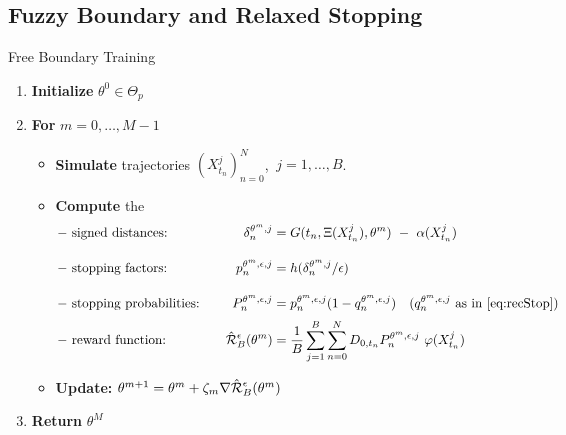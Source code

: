 \subsection{Fuzzy Boundary and Relaxed Stopping}

\begin{algorithm}[t]
\label{alg:FBTrain}
\caption{Free Boundary Training}\label{alg:cap} 
\begin{enumerate}
\setlength \itemsep{0.05ex}
\vspace{-3mm}

\item \textbf{Initialize} $\theta^{0} \in \Theta_p$
\item \textbf{For} $m = 0,\ldots, M-1$
    \begin{itemize}
    \setlength \itemsep{0.4ex}
    \vspace{-2mm}
        \item \textbf{Simulate} trajectories $(X_{t_n}^j)_{n=0}^N$, $\ j=1,\ldots,B$.
        \item 
        \textbf{Compute} the
        \vspace{-3mm}
\begin{align*}
-&\text{ signed distances:} \quad &\delta^{\theta^{m}, j}_n &=  G(t_n,\Xi(X^j_{t_n}),\theta^{m}) \ - \ \alpha(X^j_{t_n}) \\[1em]
-&\text{ stopping factors:}\quad &p^{\theta^{m},\epsilon,j}_{n} &= h(\delta^{\theta^{m}, j}_n/\epsilon) \\[1em]
 -&\text{ stopping probabilities:}\quad &P^{\theta^{m},\epsilon,j}_{n} &= p^{\theta^{m},\epsilon,j}_{n}(1-q^{\theta^{m},\epsilon,j}_{n}) \quad  \text{($q^{\theta^{m},\epsilon,j}_{n}$ as in $\eqref{eq:recStop}$)}\\[0.2em]
    -&\text{ reward function:}\quad &\hat{\operatorname{\mathcal{R}}}_B^{\epsilon}(\theta^{m}) &=  \frac{1}{B}\sum_{j=1}^B  \sum_{n=0}^N D_{0,t_n}   P^{\theta^{m},\epsilon,j}_{n}\ \varphi(X_{t_n}^j)
    \end{align*}
          \vspace{-4mm}
          
        \item \textbf{Update:} $\theta^{m+1} = \theta^{m} + \zeta_m \nabla \hat{\operatorname{\mathcal{R}}}_B^{\epsilon}(\theta^{m})$
    \end{itemize}
\item \textbf{Return} $\theta^{M}$
\vspace{-3mm}

\end{enumerate}
\end{algorithm}

